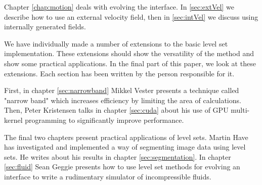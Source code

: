 Chapter \vref{chap:motion} deals with evolving the interface. In \vref{sec:extVel} we describe how to use an external velocity field, then in \vref{sec:intVel} we discuss using internally generated fields.

We have individually made a number of extensions to the basic level
set implementation. These extensions should show the versatility of
the method and show some practical applications.
In the final part of this paper, we look at these extensions. Each
section has been written by the person responsible for it.

First, in chapter \vref{sec:narrowband} Mikkel Vester presents a technique called "narrow band" which increases efficiency by limiting the area of calculations.
Then, Peter Kristensen talks in chapter \vref{sec:cuda} about his use of GPU multi-kernel programming to significantly improve performance.

The final two chapters present practical applications of level sets.
Martin Have has investigated and implemented a way of segmenting image data using level sets. He writes about his results in chapter \vref{sec:segmentation}.
In chapter \vref{sec:fluid} Sean Geggie presents how to use level set methods for evolving an interface to write a rudimentary simulator of incompressible fluids.




